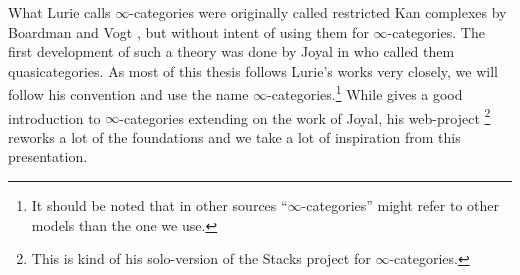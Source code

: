\documentclass[../../thesis.tex]{subfiles}
\begin{document}
What Lurie \cite{HTT} calls $\infty$-categories were originally called restricted Kan complexes by Boardman and Vogt \cite{BoardmanVogt}, but without intent of using them for $\infty$-categories.
The first development of such a theory was done by Joyal in \cite{Joyal} who called them quasicategories.
As most of this thesis follows Lurie's works very closely, we will follow his convention and use the name $\infty$-categories.\footnote{It should be noted that in other sources ``$\infty$-categories'' might refer to other models than the one we use.}
While \cite{HTT} gives a good introduction to $\infty$-categories extending on the work of Joyal, his web-project \cite{kerodon}\footnote{This is kind of his solo-version of the Stacks project for $\infty$-categories.} reworks a lot of the foundations and we take a lot of inspiration from this presentation.
\end{document}
